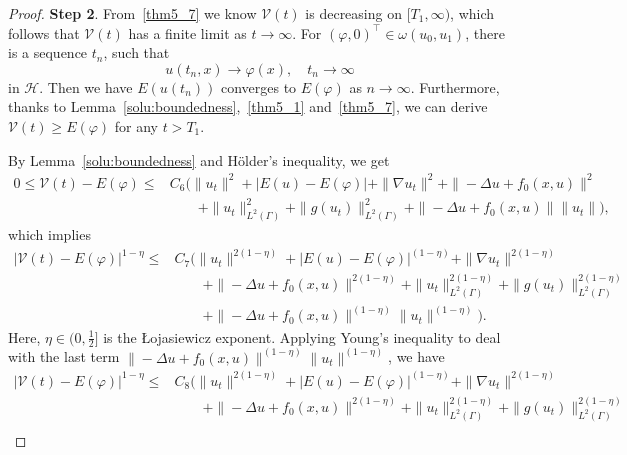 \documentclass{elsarticle}
\begin{document}
\begin{proof}
\textbf{Step 2}. 
From~\eqref{thm5_7} we know $\mathcal{V}(t)$ is decreasing on $[T_1, \infty)$, which follows that $\mathcal{V}(t)$ has a finite limit as $t\rightarrow\infty$. 
For $(\varphi, 0)^\top\in\omega(u_0, u_1)$, there is a sequence $t_n$, such that
\begin{equation} \label{thm5_8}
u(t_n, x)\rightarrow\varphi(x), \quad t_n\rightarrow\infty 
\end{equation}
in $\mathcal{H}$. Then we have $E(u(t_n))$ converges to $E(\varphi)$ as $n\rightarrow\infty$. Furthermore, thanks to Lemma~\ref{solu:boundedness},~\eqref{thm5_1} and~\eqref{thm5_7}, we can derive $\mathcal{V}(t)\geqslant E(\varphi)$ for any $t>T_1$.

By Lemma~\ref{solu:boundedness} and H\"older's inequality, we get
\begin{equation*}
\begin{split}
0\leqslant \mathcal{V}(t) - E(\varphi) \leqslant &C_6\Big(\|u_t\|^2 + |E(u) - E(\varphi)| + \|\nabla u_t\|^{2} +\|-\Delta u+f_0(x, u)\|^{2}\\
&\qquad + \|u_{t}\|^2_{L^2(\Gamma)}+ \|g(u_{t})\|^2_{L^2(\Gamma)}+\|-\Delta u+f_0(x, u)\| \|u_{t}\|\Big),
\end{split}
\end{equation*}
which implies
\begin{equation*}
\begin{split}
|\mathcal{V}(t) - E(\varphi) |^{1-\eta}\leqslant &C_7\Big(\|u_t\|^{2(1-\eta)} + |E(u) - E(\varphi)|^{(1-\eta)} + \|\nabla u_t\|^{2(1-\eta)} \\
&\qquad +\|-\Delta u+f_0(x, u)\|^{2(1-\eta)} + \|u_{t}\|^{2(1-\eta)}_{L^2(\Gamma)}+ \|g(u_{t})\|^{2(1-\eta)}_{L^2(\Gamma)} \\
&\qquad +\|-\Delta u+f_0(x, u)\|^{(1-\eta)} \|u_{t}\|^{(1-\eta)} \Big).
\end{split}
\end{equation*}
Here, $\eta\in(0, \frac{1}{2}]$ is the {\L}ojasiewicz exponent. Applying Young's inequality to deal with the last term $\|-\Delta u+f_0(x, u)\|^{(1-\eta)} \|u_{t}\|^{(1-\eta)}$, we have
\begin{equation*}
\begin{split}
|\mathcal{V}(t) - E(\varphi) |^{1-\eta}\leqslant &C_8\Big(\|u_t\|^{2(1-\eta)} + |E(u) - E(\varphi)|^{(1-\eta)} + \|\nabla u_t\|^{2(1-\eta)} \\
&\qquad +\|-\Delta u+f_0(x, u)\|^{2(1-\eta)} + \|u_{t}\|^{2(1-\eta)}_{L^2(\Gamma)} + \|g(u_{t})\|^{2(1-\eta)}_{L^2(\Gamma)} \\

\end{split}
\end{equation*}
\end{proof}
\end{document}
